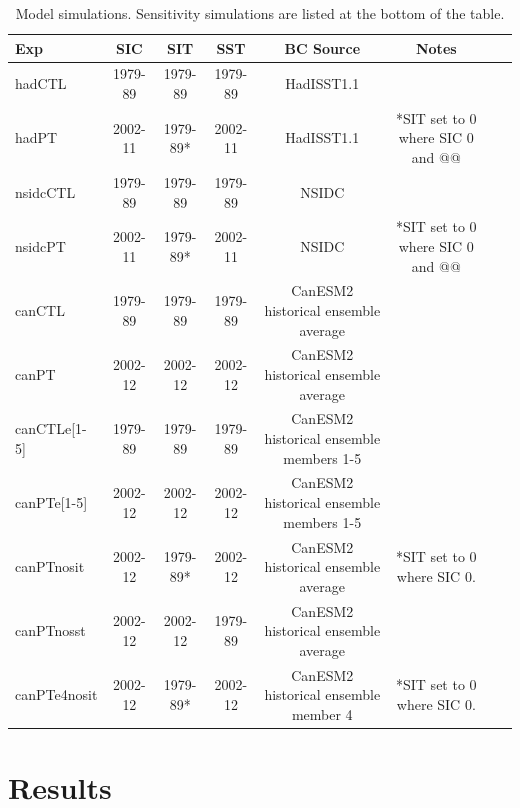 \documentclass[twocol]{ametsoc}
\begin{document}

\begin{table}[t]
\caption{Model simulations. Sensitivity simulations are listed at the bottom of the table.}\label{simstbl}
\begin{center}
\begin{tabular}{lccccccc}
\hline\hline
Exp & SIC & SIT & SST & BC Source & Notes\\
\hline
 hadCTL & 1979-89 & 1979-89 & 1979-89 & HadISST1.1 \\
 hadPT & 2002-11 & 1979-89* & 2002-11 & HadISST1.1 & *SIT set to 0 where SIC 0 and @@\\
 nsidcCTL & 1979-89 & 1979-89 & 1979-89 & NSIDC \\
 nsidcPT & 2002-11 & 1979-89* & 2002-11 & NSIDC & *SIT set to 0 where SIC 0 and @@\\
 canCTL & 1979-89 & 1979-89 & 1979-89 & CanESM2 historical ensemble average\\
 canPT & 2002-12 & 2002-12 & 2002-12 &  CanESM2 historical ensemble average\\
 canCTLe[1-5] & 1979-89 & 1979-89 & 1979-89  & CanESM2 historical ensemble members 1-5\\
 canPTe[1-5] & 2002-12 & 2002-12 & 2002-12 &  CanESM2 historical ensemble members 1-5\\
 \hline
 \hline
 canPTnosit & 2002-12 & 1979-89* & 2002-12 &  CanESM2 historical ensemble average & *SIT set to 0 where SIC 0. \\
 canPTnosst & 2002-12 & 2002-12 & 1979-89 &  CanESM2 historical ensemble average & \\
 canPTe4nosit  & 2002-12 & 1979-89* & 2002-12 &  CanESM2 historical ensemble member 4 & *SIT set to 0 where SIC 0. \\
\hline
\end{tabular}
\end{center}
\end{table}


\section{Results}
\end{document}
